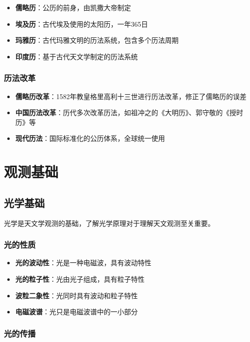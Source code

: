 \documentclass[12pt,UTF8]{ctexbook}
\begin{document}
\begin{itemize}
  \item \textbf{儒略历}：公历的前身，由凯撒大帝制定
  \item \textbf{埃及历}：古代埃及使用的太阳历，一年365日
  \item \textbf{玛雅历}：古代玛雅文明的历法系统，包含多个历法周期
  \item \textbf{印度历}：基于古代天文学制定的历法系统
\end{itemize}

\subsection{历法改革}

\begin{itemize}
  \item \textbf{儒略历改革}：1582年教皇格里高利十三世进行历法改革，修正了儒略历的误差
  \item \textbf{中国历法改革}：历代多次改革历法，如祖冲之的《大明历》、郭守敬的《授时历》等
  \item \textbf{现代历法}：国际标准化的公历体系，全球统一使用
\end{itemize}

\chapter{观测基础}
\section{光学基础}

光学是天文学观测的基础，了解光学原理对于理解天文观测至关重要。

\subsection{光的性质}

\begin{itemize}
  \item \textbf{光的波动性}：光是一种电磁波，具有波动特性
  \item \textbf{光的粒子性}：光由光子组成，具有粒子特性
  \item \textbf{波粒二象性}：光同时具有波动和粒子特性
  \item \textbf{电磁波谱}：光只是电磁波谱中的一小部分
\end{itemize}

\subsection{光的传播}
\end{document}
